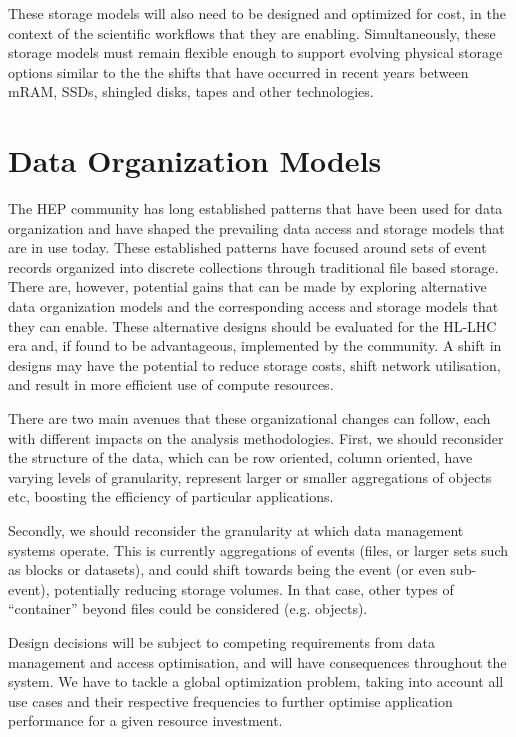 \documentclass[12pt,a4paper]{article}
\begin{document}
These storage models will also need to be designed and optimized for
cost, in the context of the scientific workflows that they are enabling.
Simultaneously, these storage models must remain flexible enough to
support evolving physical storage options similar to the the shifts that
have occurred in recent years between mRAM, SSDs, shingled disks, tapes
and other technologies. ~

\section{Data Organization Models}\label{data-organization-models}

The HEP community has long established patterns that have been used for
data organization and have shaped the prevailing data access and storage
models that are in use today. These established patterns have focused
around sets of event records organized into discrete collections through
traditional file based storage. There are, however, potential gains that
can be made by exploring alternative data organization models and the
corresponding access and storage models that they can enable. These
alternative designs should be evaluated for the HL-LHC era and, if found
to be advantageous, implemented by the community. A shift in designs may
have the potential to reduce storage costs, shift network utilisation,
and result in more efficient use of compute resources.

There are two main avenues that these organizational changes can follow,
each with different impacts on the analysis methodologies. First, we
should reconsider the structure of the data, which can be row oriented,
column oriented, have varying levels of granularity, represent larger or
smaller aggregations of objects etc, boosting the efficiency of
particular applications.

Secondly, we should reconsider the granularity at which data management
systems operate. This is currently aggregations of events (files, or
larger sets such as blocks or datasets), and could shift towards being
the event (or even sub-event), potentially reducing storage volumes. In
that case, other types of ``container'' beyond files could be considered
(e.g. objects).

Design decisions will be subject to competing requirements from data
management and access optimisation, and will have consequences
throughout the system. We have to tackle a global optimization problem,
taking into account all use cases and their respective frequencies to
further optimise application performance for a given resource
investment.
\end{document}

